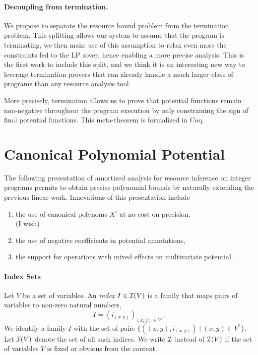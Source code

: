 \documentclass[nocopyrightspace,preprint]{sigplanconf-pldi15}
\begin{document}
\paragraph{Decoupling from termination.}
We
propose to separate the resource bound problem from the
termination problem.  This splitting allows our system
to assume that the program is terminating, we then make use
of this assumption to relax even more the constraints fed
to the LP sover, hence enabling a more precise analysis.
%
This is the first work to include this split, and we
think it is an interesting new way to leverage termination
provers that can already handle a much larger class of
programs than any resource analysis tool.

More precisely, termination allows us to prove that
potential functions remain non-negative throughout
the program execution by only constraining the sign of
final potential functions.  This meta-theorem is
formalized in Coq.


\section{Canonical Polynomial Potential}

The following presentation of amortized analysis for resource
inference on integer programs permits to obtain precise polynomial
bounds by naturally extending the previous linear work. Innovations
of this presentation include
\begin{enumerate}
\item the use of canonical polynoms $X^i$ at no cost on precision,
 \\ (I wish)
\item the use of negative coefficients in potential annotations,
\item the support for operations with mixed effects on multivariate potential.
\end{enumerate}

\paragraph{Index Sets}

Let $V$ be a set of variables.  An \emph{index} $I \in \mathcal{I}(V)$ is a
family that maps pairs of variables to non-zero natural numbers,
$$
I = (i_{(x,y)})_{(x,y) \in V^2} .
$$
%
We identify a family $I$ with the set of pairs $\{ ((x,y),i_{(x,y)})
\mid (x,y) \in V^2\}$.
Let $\mathcal{I}(V)$ denote the set of all such indices.  We write $\mathcal{I}$
instead of $\mathcal{I}(V)$ if the set of variables $V$ is fixed or obvious
from the context.
%
\end{document}
